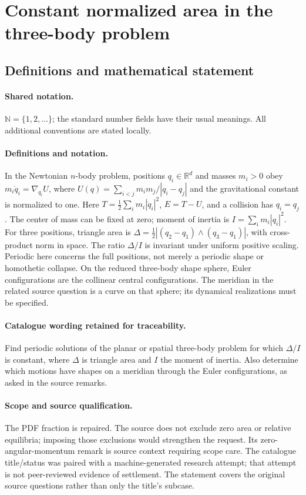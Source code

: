 \documentclass[11pt]{article}
\begin{document}
\section{Constant normalized area in the three-body problem}\label{statement}

\subsection{Definitions and mathematical statement}

\paragraph{Shared notation.}$\mathbb N=\{1,2,\ldots\}$; the standard number fields have their usual meanings. All additional conventions are stated locally.


\paragraph{Definitions and notation.}In the Newtonian $n$-body problem, positions $q_i\in\mathbb R^d$ and masses $m_i>0$ obey $m_i\ddot q_i=\nabla_{q_i}U$, where $U(q)=\sum_{i<j}m_im_j/|q_i-q_j|$ and the gravitational constant is normalized to one. Here $T=\tfrac12\sum_i m_i|\dot q_i|^2$, $E=T-U$, and a collision has $q_i=q_j$. The center of mass can be fixed at zero; moment of inertia is $I=\sum_i m_i|q_i|^2$. For three positions, triangle area is $\Delta=\tfrac12|(q_2-q_1)\wedge(q_3-q_1)|$, with cross-product norm in space. The ratio $\Delta/I$ is invariant under uniform positive scaling. Periodic here concerns the full positions, not merely a periodic shape or homothetic collapse. On the reduced three-body shape sphere, Euler configurations are the collinear central configurations. The meridian in the related source question is a curve on that sphere; its dynamical realizations must be specified.

\paragraph{Catalogue wording retained for traceability.}
Find periodic solutions of the planar or spatial three-body problem for which $\Delta/I$ is constant, where $\Delta$ is triangle area and $I$ the moment of inertia. Also determine which motions have shapes on a meridian through the Euler configurations, as asked in the source remarks.
\paragraph{Scope and source qualification.}The PDF fraction is repaired. The source does not exclude zero area or relative equilibria; imposing those exclusions would strengthen the request. Its zero-angular-momentum remark is source context requiring scope care. The catalogue title/status was paired with a machine-generated research attempt; that attempt is not peer-reviewed evidence of settlement. The statement covers the original source questions rather than only the title’s subcase.
\end{document}
